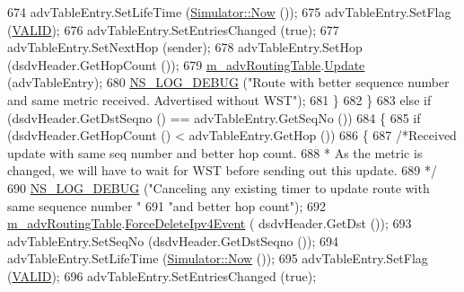 \begin{DoxyCode}
674                       advTableEntry.SetLifeTime (\hyperlink{classns3_1_1Simulator_ac3178fa975b419f7875e7105be122800}{Simulator::Now} ());
675                       advTableEntry.SetFlag (\hyperlink{namespacens3_1_1dsdv_aa1c39555b993cc6f56f2c8c6c31e2c3baf2cbf3d202d1c7338230c662e6822e65}{VALID});
676                       advTableEntry.SetEntriesChanged (\textcolor{keyword}{true});
677                       advTableEntry.SetNextHop (sender);
678                       advTableEntry.SetHop (dsdvHeader.GetHopCount ());
679                       \hyperlink{classns3_1_1dsdv_1_1RoutingProtocol_adce3cf63777d6099e58caa1cb198282c}{m\_advRoutingTable}.\hyperlink{classns3_1_1dsdv_1_1RoutingTable_a651762730975f809c720313b1332cb99}{Update} (advTableEntry);
680                       \hyperlink{group__logging_ga413f1886406d49f59a6a0a89b77b4d0a}{NS\_LOG\_DEBUG} (\textcolor{stringliteral}{"Route with better sequence number and same metric
       received. Advertised without WST"});
681                     \}
682                 \}
683               \textcolor{keywordflow}{else} \textcolor{keywordflow}{if} (dsdvHeader.GetDstSeqno () == advTableEntry.GetSeqNo ())
684                 \{
685                   \textcolor{keywordflow}{if} (dsdvHeader.GetHopCount () < advTableEntry.GetHop ())
686                     \{
687                       \textcolor{comment}{/*Received update with same seq number and better hop count.}
688 \textcolor{comment}{                       * As the metric is changed, we will have to wait for WST before sending out this
       update.}
689 \textcolor{comment}{                       */}
690                       \hyperlink{group__logging_ga413f1886406d49f59a6a0a89b77b4d0a}{NS\_LOG\_DEBUG} (\textcolor{stringliteral}{"Canceling any existing timer to update route with same
       sequence number "}
691                                     \textcolor{stringliteral}{"and better hop count"});
692                       \hyperlink{classns3_1_1dsdv_1_1RoutingProtocol_adce3cf63777d6099e58caa1cb198282c}{m\_advRoutingTable}.\hyperlink{classns3_1_1dsdv_1_1RoutingTable_a39f4b7725caafbc6cd9f7c5821470d51}{ForceDeleteIpv4Event} (
      dsdvHeader.GetDst ());
693                       advTableEntry.SetSeqNo (dsdvHeader.GetDstSeqno ());
694                       advTableEntry.SetLifeTime (\hyperlink{classns3_1_1Simulator_ac3178fa975b419f7875e7105be122800}{Simulator::Now} ());
695                       advTableEntry.SetFlag (\hyperlink{namespacens3_1_1dsdv_aa1c39555b993cc6f56f2c8c6c31e2c3baf2cbf3d202d1c7338230c662e6822e65}{VALID});
696                       advTableEntry.SetEntriesChanged (\textcolor{keyword}{true});

\end{DoxyCode}
